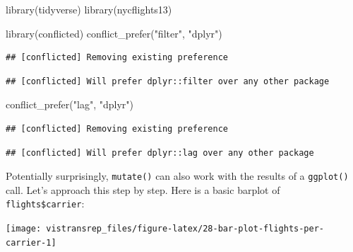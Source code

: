 \documentclass[]{book}
\newenvironment{Shaded}{}{}
\newcommand{\DataTypeTok}[1]{#1}
\newcommand{\KeywordTok}[1]{\textcolor[rgb]{0.00,0.00,1.00}{#1}}
\newcommand{\NormalTok}[1]{#1}
\newcommand{\OperatorTok}[1]{#1}
\newcommand{\StringTok}[1]{\textcolor[rgb]{0.00,0.50,0.50}{#1}}
\begin{document}
\begin{Shaded}
\begin{Highlighting}[]
\KeywordTok{library}\NormalTok{(tidyverse)}
\KeywordTok{library}\NormalTok{(nycflights13)}

\KeywordTok{library}\NormalTok{(conflicted)}
\KeywordTok{conflict_prefer}\NormalTok{(}\StringTok{"filter"}\NormalTok{, }\StringTok{"dplyr"}\NormalTok{)}
\end{Highlighting}
\end{Shaded}

\begin{verbatim}
## [conflicted] Removing existing preference
\end{verbatim}

\begin{verbatim}
## [conflicted] Will prefer dplyr::filter over any other package
\end{verbatim}

\begin{Shaded}
\begin{Highlighting}[]
\KeywordTok{conflict_prefer}\NormalTok{(}\StringTok{"lag"}\NormalTok{, }\StringTok{"dplyr"}\NormalTok{)}
\end{Highlighting}
\end{Shaded}

\begin{verbatim}
## [conflicted] Removing existing preference
\end{verbatim}

\begin{verbatim}
## [conflicted] Will prefer dplyr::lag over any other package
\end{verbatim}

Potentially surprisingly, \texttt{mutate()} can also work with the results of a \texttt{ggplot()} call.
Let's approach this step by step.
Here is a basic barplot of \texttt{flights\$carrier}:

\begin{Shaded}
\end{Shaded}

\begin{flushright}\texttt{[image: vistransrep\_files/figure-latex/28-bar-plot-flights-per-carrier-1]} \end{flushright}
\end{document}
